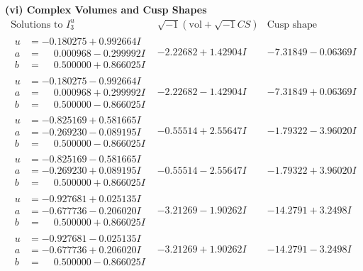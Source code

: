 \documentclass[1p]{elsarticle_modified}
\theoremstyle{definition}
\newcommand{\I}{\sqrt{-1}}
\begin{document}
\newpage\flushleft \textbf{(vi) Complex Volumes and Cusp Shapes}
$$\begin{array}{c|c|c}  
\text{Solutions to }I^u_{3}& \I (\text{vol} + \sqrt{-1}CS) & \text{Cusp shape}\\
 \hline 
\begin{aligned}
u &= -0.180275 + 0.992664 I \\
a &= \phantom{-}0.000968 - 0.299992 I \\
b &= \phantom{-}0.500000 + 0.866025 I\end{aligned}
 & -2.22682 + 1.42904 I & -7.31849 - 0.06369 I \\ \hline\begin{aligned}
u &= -0.180275 - 0.992664 I \\
a &= \phantom{-}0.000968 + 0.299992 I \\
b &= \phantom{-}0.500000 - 0.866025 I\end{aligned}
 & -2.22682 - 1.42904 I & -7.31849 + 0.06369 I \\ \hline\begin{aligned}
u &= -0.825169 + 0.581665 I \\
a &= -0.269230 - 0.089195 I \\
b &= \phantom{-}0.500000 - 0.866025 I\end{aligned}
 & -0.55514 + 2.55647 I & -1.79322 - 3.96020 I \\ \hline\begin{aligned}
u &= -0.825169 - 0.581665 I \\
a &= -0.269230 + 0.089195 I \\
b &= \phantom{-}0.500000 + 0.866025 I\end{aligned}
 & -0.55514 - 2.55647 I & -1.79322 + 3.96020 I \\ \hline\begin{aligned}
u &= -0.927681 + 0.025135 I \\
a &= -0.677736 - 0.206020 I \\
b &= \phantom{-}0.500000 + 0.866025 I\end{aligned}
 & -3.21269 - 1.90262 I & -14.2791 + 3.2498 I \\ \hline\begin{aligned}
u &= -0.927681 - 0.025135 I \\
a &= -0.677736 + 0.206020 I \\
b &= \phantom{-}0.500000 - 0.866025 I\end{aligned}
 & -3.21269 + 1.90262 I & -14.2791 - 3.2498 I \\ \hline\begin{aligned}

\end{aligned}
\end{array}$$
\end{document}
